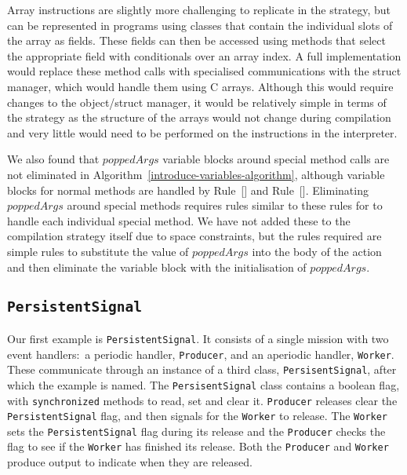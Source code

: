 Array instructions are slightly more challenging to replicate in the
strategy, but can be represented in programs using classes that
contain the individual slots of the array as fields. 
These fields can then be accessed using methods that select the
appropriate field with conditionals over an array index.
A full implementation would replace these method calls with
specialised communications with the struct manager, which would handle
them using C arrays.
Although this would require changes to the object/struct manager, it
would be relatively simple in terms of the strategy as the structure
of the arrays would not change during compilation and very little
would need to be performed on the instructions in the interpreter.

We also found that $poppedArgs$ variable blocks around special method
calls are not eliminated in
Algorithm~\ref{introduce-variables-algorithm}, although variable
blocks for normal methods are handled by
Rule~[] and
Rule~[].
Eliminating $poppedArgs$ around special methods requires rules similar
to these rules for to handle each individual special method.
We have not added these to the compilation strategy itself due to
space constraints, but the rules required are simple rules to
substitute the value of $poppedArgs$ into the body of the action and
then eliminate the variable block with the initialisation of
$poppedArgs$.





\subsection{\texorpdfstring{\texttt{PersistentSignal}}{PersistentSignal}}

Our first example is \texttt{PersistentSignal}. 
It consists of a single mission with two event handlers:~a periodic
handler, \texttt{Producer}, and an aperiodic handler, \texttt{Worker}.
These communicate through an instance of a third class,
\texttt{PersisentSignal}, after which the example is named.
The \texttt{PersisentSignal} class contains a boolean flag, with
\texttt{synchronized} methods to read, set and clear it.
\texttt{Producer} releases clear the \texttt{PersistentSignal} flag, and then signals
for the \texttt{Worker} to release.
The \texttt{Worker} sets the \texttt{PersistentSignal} flag during its
release and the \texttt{Producer} checks the flag to see if the
\texttt{Worker} has finished its release.
Both the \texttt{Producer} and \texttt{Worker} produce output to
indicate when they are released.

